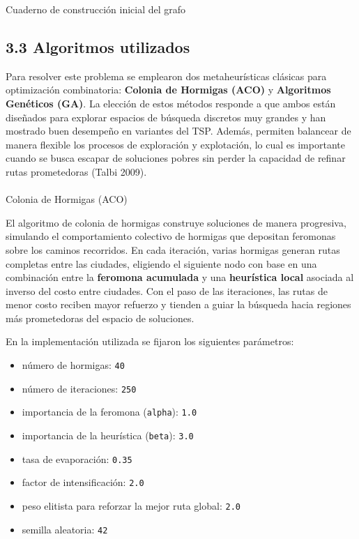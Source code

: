 \documentclass[
  12pt,
  letterpaper,
  DIV=11,
  numbers=noendperiod]{scrartcl}
\makeatletter
\let\oldparagraph\paragraph
\renewcommand{\paragraph}{
    \@ifstar
      \xxxParagraphStar
      \xxxParagraphNoStar
  }
\newcommand{\xxxParagraphStar}[1]{\oldparagraph*{#1}\mbox{}}
\newcommand{\xxxParagraphNoStar}[1]{\oldparagraph{#1}\mbox{}}
\providecommand{\tightlist}{%
  \setlength{\itemsep}{0pt}\setlength{\parskip}{0pt}}
\makeatother
\begin{document}
{ } {Cuaderno de construcción inicial del grafo}

\subsection{3.3 Algoritmos utilizados}\label{algoritmos-utilizados}

Para resolver este problema se emplearon dos metaheurísticas clásicas
para optimización combinatoria: \textbf{Colonia de Hormigas (ACO)} y
\textbf{Algoritmos Genéticos (GA)}. La elección de estos métodos
responde a que ambos están diseñados para explorar espacios de búsqueda
discretos muy grandes y han mostrado buen desempeño en variantes del
TSP. Además, permiten balancear de manera flexible los procesos de
exploración y explotación, lo cual es importante cuando se busca escapar
de soluciones pobres sin perder la capacidad de refinar rutas
prometedoras (Talbi 2009).

\paragraph{Colonia de Hormigas (ACO)}\label{colonia-de-hormigas-aco}

El algoritmo de colonia de hormigas construye soluciones de manera
progresiva, simulando el comportamiento colectivo de hormigas que
depositan feromonas sobre los caminos recorridos. En cada iteración,
varias hormigas generan rutas completas entre las ciudades, eligiendo el
siguiente nodo con base en una combinación entre la \textbf{feromona
acumulada} y una \textbf{heurística local} asociada al inverso del costo
entre ciudades. Con el paso de las iteraciones, las rutas de menor costo
reciben mayor refuerzo y tienden a guiar la búsqueda hacia regiones más
prometedoras del espacio de soluciones.

En la implementación utilizada se fijaron los siguientes parámetros:

\begin{itemize}
\tightlist
\item
  número de hormigas: \texttt{40}
\item
  número de iteraciones: \texttt{250}
\item
  importancia de la feromona (\texttt{alpha}): \texttt{1.0}
\item
  importancia de la heurística (\texttt{beta}): \texttt{3.0}
\item
  tasa de evaporación: \texttt{0.35}
\item
  factor de intensificación: \texttt{2.0}
\item
  peso elitista para reforzar la mejor ruta global: \texttt{2.0}
\item
  semilla aleatoria: \texttt{42}
\end{itemize}
\end{document}
